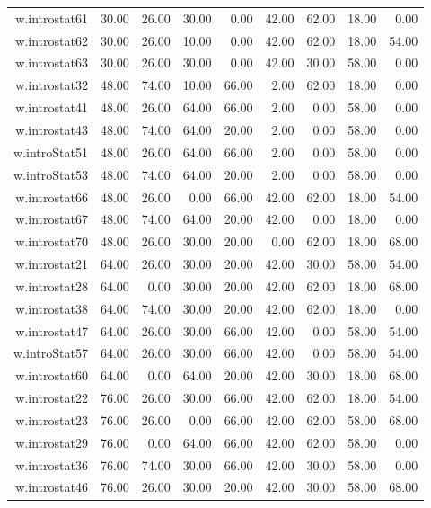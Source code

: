 \documentclass[12pt,english,nohyper]{tufte-handout}\usepackage[]{graphicx}\usepackage[]{color}
\begin{document}
\begin{longtable}{rrrrrrrrr}
  w.introstat61 & 30.00 & 26.00 & 30.00 & 0.00 & 42.00 & 62.00 & 18.00 & 0.00 \\ 
  w.introstat62 & 30.00 & 26.00 & 10.00 & 0.00 & 42.00 & 62.00 & 18.00 & 54.00 \\ 
  w.introstat63 & 30.00 & 26.00 & 30.00 & 0.00 & 42.00 & 30.00 & 58.00 & 0.00 \\ 
  w.introstat32 & 48.00 & 74.00 & 10.00 & 66.00 & 2.00 & 62.00 & 18.00 & 0.00 \\ 
  w.introstat41 & 48.00 & 26.00 & 64.00 & 66.00 & 2.00 & 0.00 & 58.00 & 0.00 \\ 
  w.introstat43 & 48.00 & 74.00 & 64.00 & 20.00 & 2.00 & 0.00 & 58.00 & 0.00 \\ 
  w.introStat51 & 48.00 & 26.00 & 64.00 & 66.00 & 2.00 & 0.00 & 58.00 & 0.00 \\ 
  w.introStat53 & 48.00 & 74.00 & 64.00 & 20.00 & 2.00 & 0.00 & 58.00 & 0.00 \\ 
  w.introstat66 & 48.00 & 26.00 & 0.00 & 66.00 & 42.00 & 62.00 & 18.00 & 54.00 \\ 
  w.introstat67 & 48.00 & 74.00 & 64.00 & 20.00 & 42.00 & 0.00 & 18.00 & 0.00 \\ 
  w.introstat70 & 48.00 & 26.00 & 30.00 & 20.00 & 0.00 & 62.00 & 18.00 & 68.00 \\ 
  w.introstat21 & 64.00 & 26.00 & 30.00 & 20.00 & 42.00 & 30.00 & 58.00 & 54.00 \\ 
  w.introstat28 & 64.00 & 0.00 & 30.00 & 20.00 & 42.00 & 62.00 & 18.00 & 68.00 \\ 
  w.introstat38 & 64.00 & 74.00 & 30.00 & 20.00 & 42.00 & 62.00 & 18.00 & 0.00 \\ 
  w.introstat47 & 64.00 & 26.00 & 30.00 & 66.00 & 42.00 & 0.00 & 58.00 & 54.00 \\ 
  w.introStat57 & 64.00 & 26.00 & 30.00 & 66.00 & 42.00 & 0.00 & 58.00 & 54.00 \\ 
  w.introstat60 & 64.00 & 0.00 & 64.00 & 20.00 & 42.00 & 30.00 & 18.00 & 68.00 \\ 
  w.introstat22 & 76.00 & 26.00 & 30.00 & 66.00 & 42.00 & 62.00 & 18.00 & 54.00 \\ 
  w.introstat23 & 76.00 & 26.00 & 0.00 & 66.00 & 42.00 & 62.00 & 58.00 & 68.00 \\ 
  w.introstat29 & 76.00 & 0.00 & 64.00 & 66.00 & 42.00 & 62.00 & 58.00 & 0.00 \\ 
  w.introstat36 & 76.00 & 74.00 & 30.00 & 66.00 & 42.00 & 30.00 & 58.00 & 0.00 \\ 
  w.introstat46 & 76.00 & 26.00 & 30.00 & 20.00 & 42.00 & 30.00 & 58.00 & 68.00 \\ 

\end{longtable}
\end{document}
